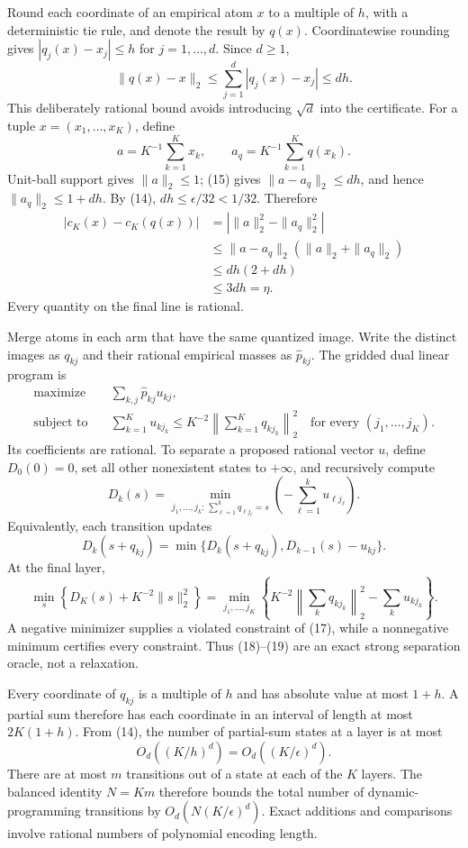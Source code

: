 Round each coordinate of an empirical atom \(x\) to a multiple of \(h\), with a deterministic tie rule, and denote the result by \(q(x)\). Coordinatewise rounding gives \(|q_j(x)-x_j|\le h\) for \(j=1,\ldots,d\). Since \(d\ge1\),
\[
\|q(x)-x\|_2
\le\sum_{j=1}^d|q_j(x)-x_j|
\le dh.
\tag{15}
\]
This deliberately rational bound avoids introducing \(\sqrt d\) into the certificate. For a tuple \(x=(x_1,\ldots,x_K)\), define
\[
a=K^{-1}\sum_{k=1}^Kx_k,
\qquad
a_q=K^{-1}\sum_{k=1}^Kq(x_k).
\]
Unit-ball support gives \(\|a\|_2\le1\); (15) gives \(\|a-a_q\|_2\le dh\), and hence \(\|a_q\|_2\le1+dh\). By (14), \(dh\le\epsilon/32<1/32\). Therefore
\[
\begin{aligned}
|c_K(x)-c_K(q(x))|
&=|\|a\|_2^2-\|a_q\|_2^2|\\
&\le\|a-a_q\|_2(\|a\|_2+\|a_q\|_2)\\
&\le dh(2+dh)\\
&\le3dh=\eta.
\end{aligned}
\tag{16}
\]
Every quantity on the final line is rational.

Merge atoms in each arm that have the same quantized image. Write the distinct images as \(q_{kj}\) and their rational empirical masses as \(\widehat p_{kj}\). The gridded dual linear program is
\[
\begin{aligned}
\text{maximize}\quad&\sum_{k,j}\widehat p_{kj}u_{kj},\\
\text{subject to}\quad&\sum_{k=1}^Ku_{k j_k}
\le K^{-2}\left\|\sum_{k=1}^Kq_{k j_k}\right\|_2^2
\quad\text{for every }(j_1,\ldots,j_K).
\end{aligned}
\tag{17}
\]
Its coefficients are rational. To separate a proposed rational vector \(u\), define \(D_0(0)=0\), set all other nonexistent states to \(+\infty\), and recursively compute
\[
D_k(s)=\min_{j_1,\ldots,j_k:\,\sum_{\ell=1}^kq_{\ell j_\ell}=s}
\left(-\sum_{\ell=1}^ku_{\ell j_\ell}\right).
\tag{18}
\]
Equivalently, each transition updates
\[
D_k(s+q_{kj})
=\min\{D_k(s+q_{kj}),D_{k-1}(s)-u_{kj}\}.
\]
At the final layer,
\[
\min_s\left\{D_K(s)+K^{-2}\|s\|_2^2\right\}
=\min_{j_1,\ldots,j_K}
\left\{K^{-2}\left\|\sum_kq_{k j_k}\right\|_2^2-\sum_ku_{k j_k}\right\}.
\tag{19}
\]
A negative minimizer supplies a violated constraint of (17), while a nonnegative minimum certifies every constraint. Thus (18)--(19) are an exact strong separation oracle, not a relaxation.

Every coordinate of \(q_{kj}\) is a multiple of \(h\) and has absolute value at most \(1+h\). A partial sum therefore has each coordinate in an interval of length at most \(2K(1+h)\). From (14), the number of partial-sum states at a layer is at most
\[
O_d((K/h)^d)=O_d((K/\epsilon)^d).
\tag{20}
\]
There are at most \(m\) transitions out of a state at each of the \(K\) layers. The balanced identity \(N=Km\) therefore bounds the total number of dynamic-programming transitions by \(O_d(N(K/\epsilon)^d)\). Exact additions and comparisons involve rational numbers of polynomial encoding length.

